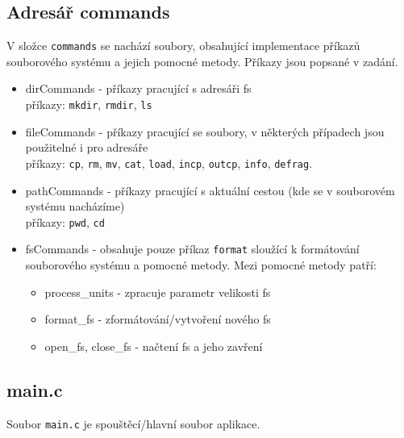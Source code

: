 \documentclass[12pt]{report}
\begin{document}
	\subsection*{Adresář commands}
	\par V složce \texttt{commands} se nachází soubory, obsahující implementace příkazů souborového systému a jejich pomocné metody. Příkazy jsou popsané v zadání.
	\begin{itemize}
		\item dirCommands - příkazy pracující s adresáři fs\\
		příkazy: \texttt{mkdir}, \texttt{rmdir}, \texttt{ls}
		\item fileCommands - příkazy pracující se soubory, v některých případech jsou použitelné i pro adresáře\\
		příkazy: \texttt{cp}, \texttt{rm}, \texttt{mv}, \texttt{cat}, \texttt{load}, \texttt{incp}, \texttt{outcp},
		\texttt{info}, \texttt{defrag}.
		\item pathCommands - příkazy pracující s aktuální cestou (kde se v souborovém systému nacházíme)\\
		příkazy: \texttt{pwd}, \texttt{cd}
		\item fsCommands - obsahuje pouze příkaz \texttt{format} sloužící k formátování souborového systému a pomocné metody. Mezi pomocné metody patří:
		\begin{itemize}
			\item process\_units - zpracuje parametr velikosti fs
			\item format\_fs - zformátování/vytvoření nového fs
			\item open\_fs, close\_fs - načtení fs a jeho zavření
		\end{itemize}
	\end{itemize}
	\subsection*{main.c}
	\par Soubor \texttt{main.c} je spouštěcí/hlavní soubor aplikace.
\end{document}
